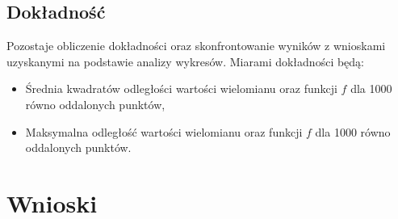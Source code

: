 \documentclass{article}
\begin{document}
\subsection{Dokładność}
Pozostaje obliczenie dokładności oraz skonfrontowanie wyników z wnioskami uzyskanymi na podstawie analizy wykresów. Miarami dokładności będą:
\begin{itemize}
    \item
    Średnia kwadratów odległości wartości wielomianu oraz funkcji $f$ dla 1000 równo oddalonych punktów,
    \item
    Maksymalna odległość wartości wielomianu oraz funkcji $f$ dla 1000 równo oddalonych punktów.
\end{itemize}

\section{Wnioski}
\end{document}

